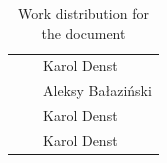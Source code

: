 \begin{table}[h]
\begin{tabular}{|l|l|l|}
        \nameref{ch:user_manual}              &                                             & Karol Denst       \\
        \nameref{ch:results}                  &                                             & Aleksy Bałaziński \\
        \nameref{ch:problems}                 &                                             & Karol Denst       \\
        \nameref{ch:improvements}             &                                             & Karol Denst       \\
        \hline
    \end{tabular}
    \caption{Work distribution for the document}
    \label{tab:division_of_work_on_the_document}
\end{table}